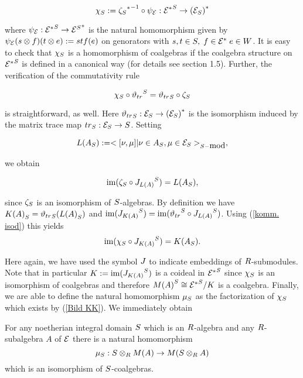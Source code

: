 \documentclass[twoside,12pt]{article}
\begin{document}
\[{\chi}_{S}:={{{\zeta}_{S}}^*}^{-1}\circ\psi_{{\cal E}}:
{{{\cal E}}^*}^{S}\rightarrow {({{\cal E}}_{S})}^*
\]

where  $\psi_{{\cal E}}:{{{\cal E}}^*}^{S}\rightarrow {{{\cal E}}^{S}}^*$ is the natural
homomorphism given by
$\psi_{{\cal E}}(s \otimes f)(t \otimes e):=stf(e)$
on genorators with $s,t \in S, \; f \in {{\cal E}}^*
\; e \in W$. It is easy to check 
that ${\chi}_{S}$ is a homomorphism of coalgebras
if the coalgebra structure on ${{{\cal E}}^*}^{S}$ is defined in a canonical
way (for details see \cite{doc} section 1.5). Further, the verification
of the commutativity rule

\begin{equation} \label{komm. isod}
{\chi}_{S}\circ {{\vartheta}_{tr}}^{S}={{\vartheta}_{tr}}_{S}\circ {\zeta}_{S}
\end{equation}

is straightforward, as well. Here ${{\vartheta}_{tr}}_{S}:{{\cal E}}_{S}\rightarrow
{({{\cal E}}_{S})}^*$ is the isomorphism induced by the
matrix trace map ${tr}_{S}:{{\cal E}}_{S}\rightarrow S$. Setting

\[L({A}_{S}):=<[\nu,\mu ]| \nu \in {A}_{S}, \mu \in {{\cal E}}_{S}
>_{S
-\mbox{mod}},\]

we obtain

\[ {\rm im}({\zeta}_{S}\circ {J_{L(A)}}^{S})=L({A}_{S}),\]

since ${\zeta}_{S}$ is an isomorphism of $S$-algebras. By
definition we have ${K(A)}_{S}={{\vartheta}_{tr}}_{S}({L(A)}_{S})$
and ${\rm im}({J_{K(A)}}^{S})={\rm im}({{\vartheta}_{tr}}^{S}\circ {J_{L(A)}}^{S})$.
Using (\ref{komm. isod}) this yields
\begin{equation} \label{Bild KK}
{\rm im}({\chi}_{S}\circ {J_{K(A)}}^{S})=K({A}_{S}).
\end{equation}

Here again, we have used the symbol $J$ to indicate embeddings
of $R$-submodules. Note that in particular $K:= {\rm im}({J_{K(A)}}^{S})$ is
a coideal in ${{{\cal E}}^*}^{S}$ since ${\chi}_{S}$ is an isomorphism of
coalgebras and therefore
${M(A)}^{S}\cong {{{\cal E}}^*}^{S}/ K$ is a coalgebra.
Finally, we are able to define the natural homomorphism ${\mu}_{S}$
as the factorization of ${\chi}_{S}$ 
which exists by (\ref{Bild KK}).
We immediately obtain

\begin{thm}   \label{base extension}
For any noetherian integral domain $S$ which is an $R$-algebra and any
$R$-subalgebra $A$ of ${\cal E}$ there is a  natural homomorphism
\[ {\mu}_{S}:S \otimes_{R}M(A) \rightarrow M(S \otimes_{R} A) \]
which is an isomorphism of $S$-coalgebras. 
\end{thm}
\end{document}
